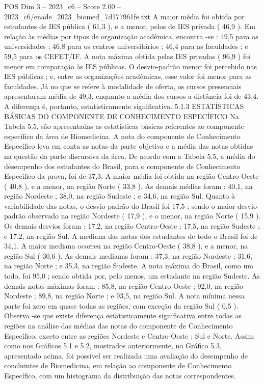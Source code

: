 \begin{textsample}{POS Dim 3 – 2023\_c6 – Score 2.00 – 2023\_c6/enade\_2023\_biomed\_7d177961fe.txt}
A maior média foi obtida por estudantes de IES pública ( 61,3 ), e a menor, pelos de IES privada ( 46,9 ).
Em relação às médias por tipos de organização acadêmica, encontra -se : 49,5 para as universidades ; 46,8 para os centros universitários ; 46,4 para as faculdades ; e 59,5 para os CEFET/IF.
A nota máxima obtida pelas IES privadas ( 96,9 ) foi menor em comparação às IES públicas.
O desvio-padrão menor foi percebido nas IES públicas ; e, entre as organizações acadêmicas, esse valor foi menor para as faculdades.
Já no que se refere à modalidade de oferta, os cursos presenciais apresentaram média de 49,3, enquanto a média dos cursos a distância foi de 43,4.
A diferença é, portanto, estatisticamente significativa. 5.1.3 ESTATÍSTICAS BÁSICAS DO COMPONENTE DE CONHECIMENTO ESPECÍFICO Na Tabela 5.5, são apresentadas as estatísticas básicas referentes ao componente específico da área de Biomedicina.
A nota do componente de Conhecimento Específico leva em conta as notas da parte objetiva e a média das notas obtidas na questão da parte discursiva da área.
De acordo com a Tabela 5.5, a média do desempenho dos estudantes do Brasil, para o componente de Conhecimento Específico da prova, foi de 37,3.
A maior média foi obtida na região Centro-Oeste ( 40,8 ), e a menor, na região Norte ( 33,8 ).
As demais médias foram : 40,1, na região Nordeste ; 38,0, na região Sudeste ; e 34,6, na região Sul.
Quanto à variabilidade das notas, o desvio-padrão do Brasil foi 17,5 ; sendo o maior desvio-padrão observado na região Nordeste ( 17,9 ), e o menor, na região Norte ( 15,9 ).
Os demais desvios foram : 17,2, na região Centro-Oeste ; 17,5, na região Sudeste ; e 17,2, na região Sul.
A mediana das notas dos estudantes de todo o Brasil foi de 34,1.
A maior mediana ocorreu na região Centro-Oeste ( 38,8 ), e a menor, na região Sul ( 30,6 ).
As demais medianas foram : 37,3, na região Nordeste ; 31,6, na região Norte ; e 35,3, na região Sudeste.
A nota máxima do Brasil, como um todo, foi 95,0 ; sendo obtida por, pelo menos, um estudante na região Sudeste.
As demais notas máximas foram : 85,8, na região Centro-Oeste ; 92,0, na região Nordeste ; 89,8, na região Norte ; e 93,5, na região Sul.
A nota mínima nessa parte foi zero em quase todas as regiões, com exceção da região Sul ( 0,5 ).
Observa -se que existe diferença estatisticamente significativa entre todas as regiões na análise das médias das notas do componente de Conhecimento Específico, exceto entre as regiões Nordeste e Centro-Oeste ; Sul e Norte.
Assim como nos Gráficos 5.1 e 5.2, mostrados anteriormente, no Gráfico 5.3, apresentado acima, foi possível ser realizada uma avaliação do desempenho de concluintes de Biomedicina, em relação ao componente de Conhecimento Específico, com um histograma da distribuição das notas correspondentes.

\end{textsample}

